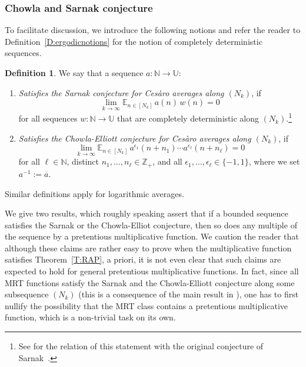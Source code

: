 \documentclass[11pt]{amsart}
\newtheorem{theorem}[lemma]{Theorem}
\theoremstyle{definition}
\newtheorem{definition}{Definition}[section]
\newcommand{\E}{{\mathbb E}}
\newcommand{\N}{{\mathbb N}}
\newcommand{\Z}{{\mathbb Z}}
\newcommand{\U}{{\mathbb U}}
\begin{document}
\subsubsection{Chowla and Sarnak conjecture}
To facilitate discussion, we introduce the following notions and refer  the reader to Definition~\ref{D:ergodicnotions} for the notion of  completely deterministic sequences.
\begin{definition}
	 We say that a sequence   $a\colon \N\to \U$:
	\begin{enumerate}
		\item {\em Satisfies the Sarnak conjecture for Ces\`aro averages along $(N_k)$}, if
		$$
		\lim_{k\to\infty}\E_{n\in[N_k]}\, a(n)\, w(n)=0
		$$
		for all  sequences $w\colon \N\to \U$ that are   completely deterministic  along $(N_k)$.\footnote{See \cite{AKLR14} for the relation  of this statement with the original conjecture of Sarnak~\cite{S}.}

		\smallskip
		
		\item  {\em  Satisfies the Chowla-Elliott  conjecture for Ces\`aro averages along $(N_k)$}, if
		\begin{equation}\label{E:CE}
		\lim_{k\to \infty} \E_{n\in[N_k]}\,  a^{\epsilon_1}(n+n_1)\cdots a^{\epsilon_\ell}(n+n_\ell)=0
		\end{equation}
		for all $\ell\in \N$, distinct $n_1,\ldots, n_\ell\in \Z_+$, and all $\epsilon_1,\ldots, \epsilon_\ell\in \{-1, 1\}$,
		where we set  $a^{-1}:=\overline{a}$.
		\end{enumerate}
	Similar definitions apply for logarithmic averages.
\end{definition}
We give two results, which  roughly speaking assert that if a bounded sequence satisfies the Sarnak or the Chowla-Elliot conjecture, then so does any multiple of the sequence
  by a pretentious multiplicative function.
We caution the reader that although these claims are rather easy to prove when the multiplicative function satisfies Theorem~\ref{T:RAP},
 a priori,
it is not   even clear  that such  claims are expected to hold for general pretentious multiplicative functions.  In fact, since all MRT functions satisfy the
Sarnak and the Chowla-Elliott conjecture along some subsequence $(N_k)$ (this is a consequence of the main result in \cite{GLR21}), one has to first nullify the possibility that the MRT class contains a pretentious multiplicative function, which is a non-trivial task on its own.

	
\end{document}
